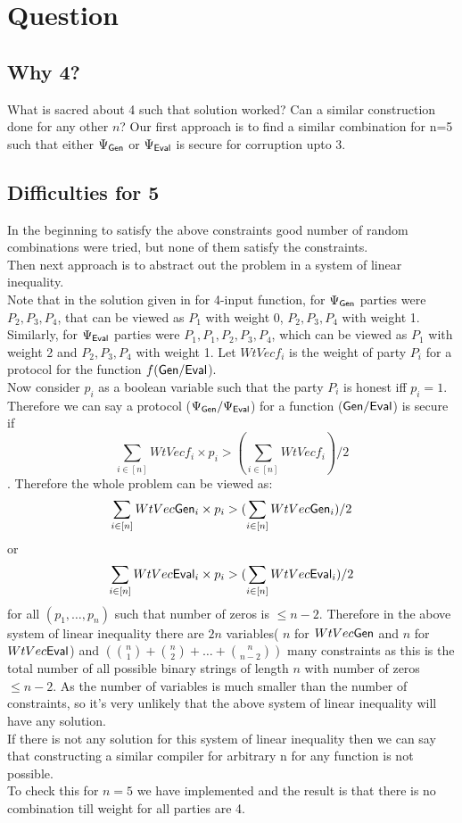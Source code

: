 \section{Question}
\subsection{Why 4?}
What is sacred about 4 such that solution worked? Can a similar construction done for any other $n$? Our first approach is to find a similar combination for n=5 such that either $\Psi_{\mathsf{Gen}}$ or $\Psi_{\mathsf{Eval}}$ is secure for corruption upto 3.
\subsection{Difficulties for 5}
In the beginning to satisfy the above constraints good number of random combinations were tried, but none of them satisfy the constraints.\\ %
Then next approach is to abstract out the problem in a system of linear inequality.\\
Note that in the solution given in \cite{BITMPC} for 4-input function, for $\Psi_{\mathsf{Gen}}$ parties were $P_2,P_3,P_4$, that can be viewed as $P_1$ with weight 0, $P_2,P_3,P_4$ with weight 1. Similarly, for $\Psi_{\mathsf{Eval}}$ parties were $P_1, P_1, P_2,P_3,P_4$, which can be viewed as $P_1$ with weight 2 and $P_2,P_3,P_4$ with weight 1. Let $WtVecf_i$ is the weight of party $P_i$ for a protocol for the function $f(\mathsf{Gen}/\mathsf{Eval}$).\\
Now consider $p_i$ as a boolean variable such that the party $P_i$ is honest iff $p_i=1$. Therefore we can say a protocol ($\Psi_{\mathsf{Gen}}/\Psi_{\mathsf{Eval}}$) for a function ($\mathsf{Gen} /\mathsf{Eval}$) is secure if 
$$ \sum_{i\in[n]} WtVecf_i \times p_i > (\sum_{i\in[n]} WtVecf_i)/2$$.
Therefore the whole problem can be viewed as:
$$ \sum_{i\in[n]} WtVec\mathsf{Gen}_i \times p_i > (\sum_{i\in[n]} WtVec\mathsf{Gen}_i)/2$$ or
$$ \sum_{i\in[n]} WtVec\mathsf{Eval}_i \times p_i > (\sum_{i\in[n]} WtVec\mathsf{Eval}_i)/2$$
for all $(p_1,\ldots, p_n)$ such that number of zeros is $\leq n-2$.
Therefore in the above system of linear inequality there are $2n$ variables( $n$ for $WtVec\mathsf{Gen}$ and $n$ for $WtVec\mathsf{Eval}$) and $(\binom{n}{1} + \binom{n}{2} +  \ldots + \binom{n}{n-2})$ many constraints as this is the total number of all possible binary strings of length $n$ with number of zeros $\leq n-2$.
As the number of variables is much smaller than the number of constraints, so it's very unlikely that the above system of linear inequality will have any solution.\\
If there is not any solution for this system of linear inequality then we can say that constructing a similar compiler for arbitrary n for any function is not possible.\\
To check this for $n=5$ we have implemented and the result is that there is no combination till weight for all parties are 4.  
